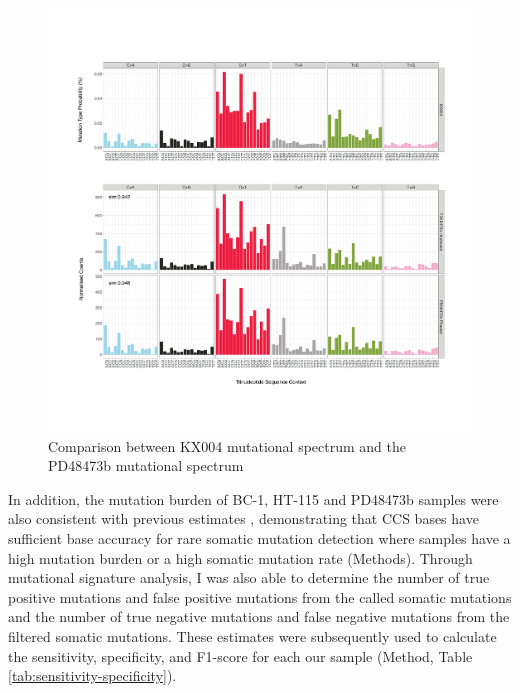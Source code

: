\begin{figure}[htbp!]
\caption{Comparison between KX004 mutational spectrum and the PD48473b mutational spectrum}
\label{figure:PD48473b}
\includegraphics[width=\textwidth]{Vector/hg19.KX001.PD48473b.pdf}
\end{figure}

In addition, the mutation burden of BC-1, HT-115 and PD48473b samples were also consistent with previous estimates \cite{Mitchell2022-ry, Petljak2019-wi}, demonstrating that CCS bases have sufficient base accuracy for rare somatic mutation detection where samples have a high mutation burden or a high somatic mutation rate (Methods). Through mutational signature analysis, I was also able to determine the number of true positive mutations and false positive mutations from the called somatic mutations and the number of true negative mutations and false negative mutations from the filtered somatic mutations. These estimates were subsequently used to calculate the sensitivity, specificity, and F1-score for each our sample (Method, Table \ref{tab:sensitivity-specificity}).

